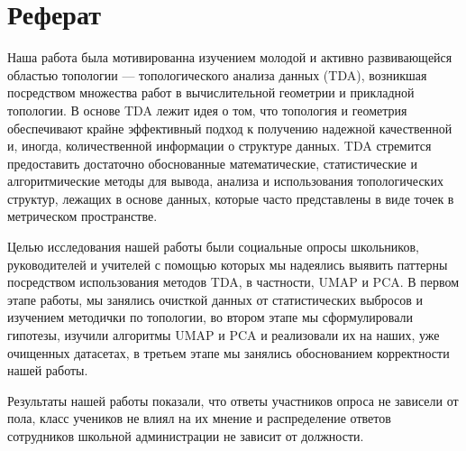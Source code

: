 \section*{Реферат}

Наша работа была мотивированна изучением молодой и активно развивающейся областью топологии --- топологического анализа данных (TDA), возникшая посредством множества работ в вычислительной геометрии и прикладной топологии. 
В основе TDA лежит идея о том, что топология и геометрия обеспечивают крайне эффективный подход к получению надежной качественной и, иногда, количественной информации о структуре данных.
TDA стремится предоставить достаточно обоснованные математические, статистические и алгоритмические методы для вывода, анализа и использования топологических структур, лежащих в основе данных, которые часто представлены в виде точек в метрическом пространстве. 

Целью исследования нашей работы были социальные опросы школьников, руководителей и учителей с помощью которых мы надеялись выявить паттерны посредством использования методов TDA, в частности, UMAP и PCA.
В первом этапе работы, мы занялись очисткой данных от статистических выбросов и изучением методички по топологии, во втором этапе мы сформулировали гипотезы, изучили алгоритмы UMAP и PCA и реализовали их на наших, уже очищенных датасетах, в третьем этапе мы занялись обоснованием корректности нашей работы.

Результаты нашей работы показали, что ответы участников опроса не зависели от пола, класс учеников не влиял на их мнение и распределение ответов сотрудников школьной администрации не зависит от должности.
